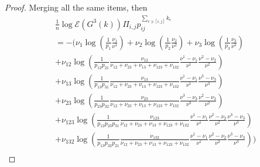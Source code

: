 \documentclass[11pt,en,cite=authoryear]{elegantpaper}
\begin{document}
\begin{proof}
    Merging all the same items, then
    \begin{align*}
        &\frac{1}{n} \log \mathcal{E} (G^3(k)) \Pi_{i, j} p_{ij}^{\sum_{c \ni [i,j]} k_{c}} \\
        &= -\biggl(
        \nu_1 \log(\frac{1}{p_{1}} \frac{\nu_1}{\nu^1})
        + \nu_2 \log(\frac{1}{p_{2}} \frac{\nu_2}{\nu^2})
        + \nu_3 \log(\frac{1}{p_{3}} \frac{\nu_3}{\nu^3}) \\
        &+\nu_{12} \log(\frac{1}{p_{12}p_{21}} \frac{\nu_{12}}{\nu_{12}+\nu_{23}+\nu_{13}+\nu_{123}+\nu_{132}} 
        \frac{\nu^{1}-\nu_{1}}{\nu^{1}}\frac{\nu^{2}-\nu_{2}}{\nu^{2}}) \\
        &+ \nu_{13} \log(\frac{1}{p_{13}p_{31}} \frac{\nu_{13}}{\nu_{12}+\nu_{23}+\nu_{13}+\nu_{123}+\nu_{132}}
        \frac{\nu^{1}-\nu_{1}}{\nu^{1}}\frac{\nu^{3}-\nu_{3}}{\nu^{3}}) \\
        &+ \nu_{23} \log(\frac{1}{p_{23}p_{32}} \frac{\nu_{23}}{\nu_{12}+\nu_{23}+\nu_{13}+\nu_{123}+\nu_{132}} 
        \frac{\nu^{3}-\nu_{3}}{\nu^{3}}\frac{\nu^{2}-\nu_{2}}{\nu^{2}}) \\
        &+ \nu_{123} \log(\frac{1}{p_{12}p_{23}p_{31}} \frac{\nu_{123}}{\nu_{12}+\nu_{23}+\nu_{13}+\nu_{123}+\nu_{132}}
        \frac{\nu^{1}-\nu_{1}}{\nu^{1}}\frac{\nu^{2}-\nu_{2}}{\nu^{2}} \frac{\nu^{3}-\nu_{3}}{\nu^{3}}) \\
        &+ \nu_{132} \log(\frac{1}{p_{13}p_{32}p_{21}} \frac{\nu_{132}}{\nu_{12}+\nu_{23}+\nu_{13}+\nu_{123}+\nu_{132}}
        \frac{\nu^{1}-\nu_{1}}{\nu^{1}}\frac{\nu^{2}-\nu_{2}}{\nu^{2}} \frac{\nu^{3}-\nu_{3}}{\nu^{3}}) \biggr)\\
    \end{align*}


\end{proof}
\end{document}
